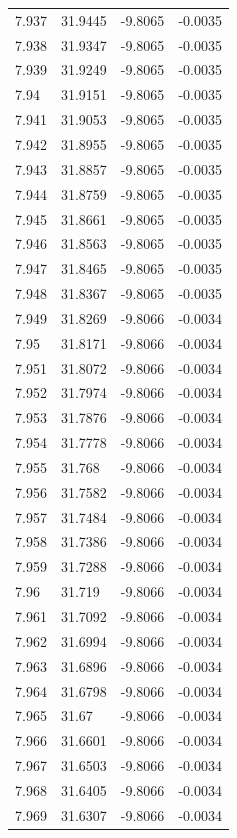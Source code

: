\begin{tabular}{llll}
7.937 & 31.9445 & -9.8065 & -0.0035 \\
7.938 & 31.9347 & -9.8065 & -0.0035 \\
7.939 & 31.9249 & -9.8065 & -0.0035 \\
7.94 & 31.9151 & -9.8065 & -0.0035 \\
7.941 & 31.9053 & -9.8065 & -0.0035 \\
7.942 & 31.8955 & -9.8065 & -0.0035 \\
7.943 & 31.8857 & -9.8065 & -0.0035 \\
7.944 & 31.8759 & -9.8065 & -0.0035 \\
7.945 & 31.8661 & -9.8065 & -0.0035 \\
7.946 & 31.8563 & -9.8065 & -0.0035 \\
7.947 & 31.8465 & -9.8065 & -0.0035 \\
7.948 & 31.8367 & -9.8065 & -0.0035 \\
7.949 & 31.8269 & -9.8066 & -0.0034 \\
7.95 & 31.8171 & -9.8066 & -0.0034 \\
7.951 & 31.8072 & -9.8066 & -0.0034 \\
7.952 & 31.7974 & -9.8066 & -0.0034 \\
7.953 & 31.7876 & -9.8066 & -0.0034 \\
7.954 & 31.7778 & -9.8066 & -0.0034 \\
7.955 & 31.768 & -9.8066 & -0.0034 \\
7.956 & 31.7582 & -9.8066 & -0.0034 \\
7.957 & 31.7484 & -9.8066 & -0.0034 \\
7.958 & 31.7386 & -9.8066 & -0.0034 \\
7.959 & 31.7288 & -9.8066 & -0.0034 \\
7.96 & 31.719 & -9.8066 & -0.0034 \\
7.961 & 31.7092 & -9.8066 & -0.0034 \\
7.962 & 31.6994 & -9.8066 & -0.0034 \\
7.963 & 31.6896 & -9.8066 & -0.0034 \\
7.964 & 31.6798 & -9.8066 & -0.0034 \\
7.965 & 31.67 & -9.8066 & -0.0034 \\
7.966 & 31.6601 & -9.8066 & -0.0034 \\
7.967 & 31.6503 & -9.8066 & -0.0034 \\
7.968 & 31.6405 & -9.8066 & -0.0034 \\
7.969 & 31.6307 & -9.8066 & -0.0034 \\

\end{tabular}
